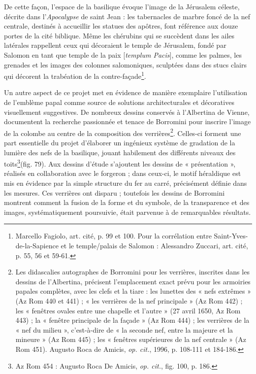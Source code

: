 \documentclass[12pt,twoside,openany]{book}
\begin{document}
De cette façon, l’espace de la basilique évoque l’image de la Jérusalem céleste, décrite dans l’\textit{Apocalypse} de saint Jean : les tabernacles de marbre foncé de la nef centrale, destinés à accueillir les statues des apôtres, font référence aux douze portes de la cité biblique. Même les chérubins qui se succèdent dans les ailes latérales rappellent ceux qui décoraient le temple de Jérusalem, fondé par Salomon en tant que temple de la paix [\textit{templum Pacis}], comme les palmes, les grenades et les images des colonnes salomoniques, sculptées dans des stucs clairs qui décorent la trabéation de la contre-façade\footnote{Marcello Fagiolo, art\textit{. }cité, p. 99 et 100. Pour la corrélation entre Saint-Yves-de-la-Sapience et le temple/palais de Salomon : Alessandro Zuccari, art. cité, p. 55, 56 et 59-61.}.

Un autre aspect de ce projet met en évidence de manière exemplaire l’utilisation de l’emblème papal comme source de solutions architecturales et décoratives visuellement suggestives. De nombreux dessins conservés à l’Albertina de Vienne, documentent la recherche passionnée et tenace de Borromini pour inscrire l’image de la colombe au centre de la composition des verrières\footnote{Les didascalies autographes de Borromini pour les verrières, inscrites dans les dessins de l’Albertina, précisent l’emplacement exact prévu pour les armoiries papales complètes, avec les clefs et la tiare : les lunettes des « nefs extrêmes » (Az Rom 440 et 441) ; « les verrières de la nef principale » (Az Rom 442) ; les « fenêtres ovales entre une chapelle et l’autre » (27 avril 1650, Az Rom 443) ; la « fenêtre principale de la façade » (Az Rom 444) ; les verrières de la « nef du milieu », c’est-à-dire de « la seconde nef, entre la majeure et la mineure » (Az Rom 445) ; les « fenêtres supérieures de la nef centrale » (Az Rom 451). Augusto Roca de Amicis, \textit{op. cit.}, 1996, p. 108-111 et 184-186.}. Celles-ci forment une part essentielle du projet d’élaborer un ingénieux système de gradation de la lumière des nefs de la basilique, jouant habilement des différents niveaux des toits\footnote{Az Rom 454 : Augusto Roca De Amicis, \textit{op. cit.}, fig. 100, p. 186.}(fig. 79). Aux dessins d’étude s’ajoutent les dessins de « présentation », réalisés en collaboration avec le forgeron ; dans ceux-ci, le motif héraldique est mis en évidence par la simple structure du fer au carré, précisément définie dans les mesures. Ces verrières ont disparu ; toutefois les dessins de Borromini montrent comment la fusion de la forme et du symbole, de la transparence et des images, systématiquement poursuivie, était parvenue à de remarquables résultats.
\end{document}
